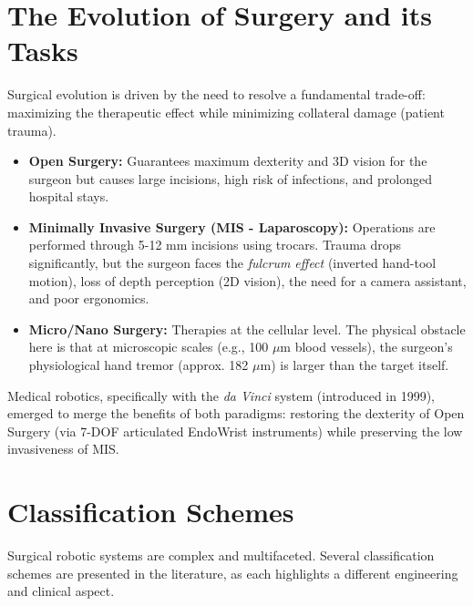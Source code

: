 \documentclass[11pt,a4paper,twoside]{report}
\begin{document}
\section{The Evolution of Surgery and its Tasks}
Surgical evolution is driven by the need to resolve a fundamental trade-off: maximizing the therapeutic effect while minimizing collateral damage (patient trauma).
\begin{itemize}
    \item \textbf{Open Surgery:} Guarantees maximum dexterity and 3D vision for the surgeon but causes large incisions, high risk of infections, and prolonged hospital stays.
    \item \textbf{Minimally Invasive Surgery (MIS - Laparoscopy):} Operations are performed through 5-12 mm incisions using trocars. Trauma drops significantly, but the surgeon faces the \textit{fulcrum effect} (inverted hand-tool motion), loss of depth perception (2D vision), the need for a camera assistant, and poor ergonomics.
    \item \textbf{Micro/Nano Surgery:} Therapies at the cellular level. The physical obstacle here is that at microscopic scales (e.g., 100 $\mu$m blood vessels), the surgeon's physiological hand tremor (approx. 182 $\mu$m) is larger than the target itself.
\end{itemize}
Medical robotics, specifically with the \textit{da Vinci} system (introduced in 1999), emerged to merge the benefits of both paradigms: restoring the dexterity of Open Surgery (via 7-DOF articulated EndoWrist instruments) while preserving the low invasiveness of MIS.

\section{Classification Schemes}
Surgical robotic systems are complex and multifaceted. Several classification schemes are presented in the literature, as each highlights a different engineering and clinical aspect.
\end{document}
